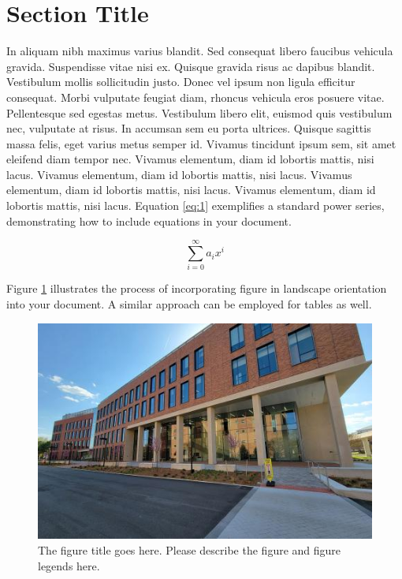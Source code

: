 \section{Section Title}
In aliquam nibh maximus varius blandit. Sed consequat libero faucibus vehicula gravida. Suspendisse vitae nisi ex. Quisque gravida risus ac dapibus blandit. Vestibulum mollis sollicitudin justo. Donec vel ipsum non ligula efficitur consequat. Morbi vulputate feugiat diam, rhoncus vehicula eros posuere vitae. Pellentesque sed egestas metus. Vestibulum libero elit, euismod quis vestibulum nec, vulputate at risus. In accumsan sem eu porta ultrices. Quisque sagittis massa felis, eget varius metus semper id. Vivamus tincidunt ipsum sem, sit amet eleifend diam tempor nec. Vivamus elementum, diam id lobortis mattis, nisi lacus. Vivamus elementum, diam id lobortis mattis, nisi lacus. Vivamus elementum, diam id lobortis mattis, nisi lacus. Vivamus elementum, diam id lobortis mattis, nisi lacus. 
Equation \ref{eq:1} exemplifies a standard power series, demonstrating how to include equations in your document.

\begin{equation} \label{eq:1}
\sum_{i=0}^{\infty} a_i x^i
\end{equation}

Figure \ref{fig:logo_landscape} illustrates the process of incorporating figure in landscape orientation into your document. A similar approach can be employed for tables as well.

\begin{figure}
\includegraphics[width=\columnwidth]{Figures/cos_landscape.jpg}
\caption[The figure title goes here.]{The figure title goes here. Please describe the figure and figure legends here.}
\label{fig:logo_landscape}
\end{figure}
